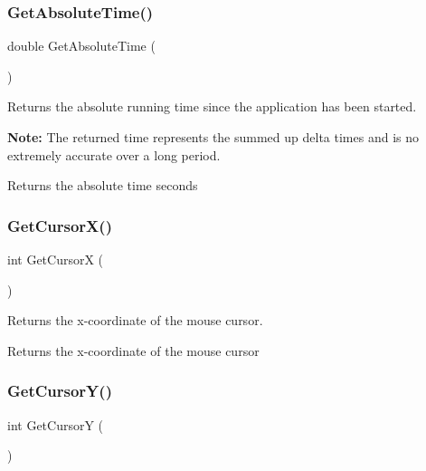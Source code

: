 \subsubsection{\texorpdfstring{Get\+Absolute\+Time()}{GetAbsoluteTime()}}
{\footnotesize\ttfamily double Get\+Absolute\+Time (\begin{DoxyParamCaption}{ }\end{DoxyParamCaption})}

Returns the absolute running time since the application has been started.

{\bfseries Note\+:} The returned time represents the summed up delta times and is no extremely accurate over a long period.

\begin{DoxyReturn}{Returns}
the absolute time seconds 
\end{DoxyReturn}
\mbox{\label{group__sdl__group_ga7c508c83150dcd127156d9c4e2436a8e}} 
\subsubsection{\texorpdfstring{Get\+Cursor\+X()}{GetCursorX()}}
{\footnotesize\ttfamily int Get\+CursorX (\begin{DoxyParamCaption}{ }\end{DoxyParamCaption})}

Returns the x-\/coordinate of the mouse cursor.

\begin{DoxyReturn}{Returns}
the x-\/coordinate of the mouse cursor 
\end{DoxyReturn}
\mbox{\label{group__sdl__group_ga4769e37502d12fbc431ace1a32749bc8}} 
\subsubsection{\texorpdfstring{Get\+Cursor\+Y()}{GetCursorY()}}
{\footnotesize\ttfamily int Get\+CursorY (\begin{DoxyParamCaption}{ }\end{DoxyParamCaption})}

